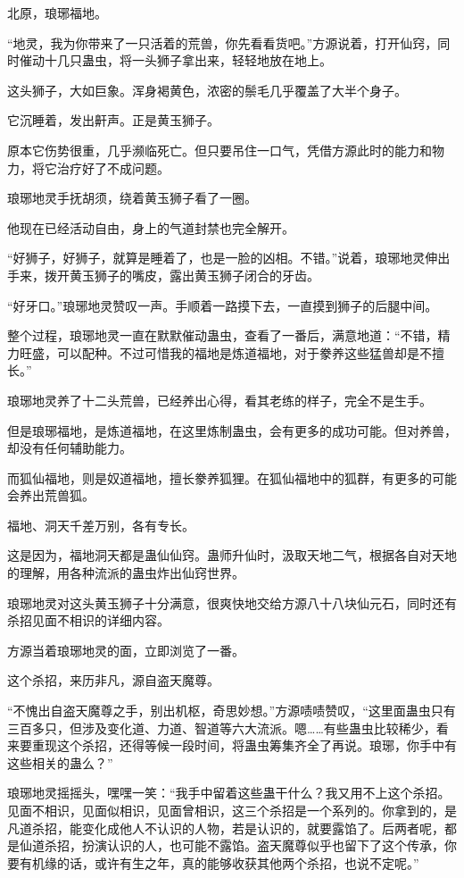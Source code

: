 
\begin{this_body}

北原，琅琊福地。

“地灵，我为你带来了一只活着的荒兽，你先看看货吧。”方源说着，打开仙窍，同时催动十几只蛊虫，将一头狮子拿出来，轻轻地放在地上。

这头狮子，大如巨象。浑身褐黄色，浓密的鬃毛几乎覆盖了大半个身子。

它沉睡着，发出鼾声。正是黄玉狮子。

原本它伤势很重，几乎濒临死亡。但只要吊住一口气，凭借方源此时的能力和物力，将它治疗好了不成问题。

琅琊地灵手抚胡须，绕着黄玉狮子看了一圈。

他现在已经活动自由，身上的气道封禁也完全解开。

“好狮子，好狮子，就算是睡着了，也是一脸的凶相。不错。”说着，琅琊地灵伸出手来，拨开黄玉狮子的嘴皮，露出黄玉狮子闭合的牙齿。

“好牙口。”琅琊地灵赞叹一声。手顺着一路摸下去，一直摸到狮子的后腿中间。

整个过程，琅琊地灵一直在默默催动蛊虫，查看了一番后，满意地道：“不错，精力旺盛，可以配种。不过可惜我的福地是炼道福地，对于豢养这些猛兽却是不擅长。”

琅琊地灵养了十二头荒兽，已经养出心得，看其老练的样子，完全不是生手。

但是琅琊福地，是炼道福地，在这里炼制蛊虫，会有更多的成功可能。但对养兽，却没有任何辅助能力。

而狐仙福地，则是奴道福地，擅长豢养狐狸。在狐仙福地中的狐群，有更多的可能会养出荒兽狐。

福地、洞天千差万别，各有专长。

这是因为，福地洞天都是蛊仙仙窍。蛊师升仙时，汲取天地二气，根据各自对天地的理解，用各种流派的蛊虫炸出仙窍世界。

琅琊地灵对这头黄玉狮子十分满意，很爽快地交给方源八十八块仙元石，同时还有杀招见面不相识的详细内容。

方源当着琅琊地灵的面，立即浏览了一番。

这个杀招，来历非凡，源自盗天魔尊。

“不愧出自盗天魔尊之手，别出机枢，奇思妙想。”方源啧啧赞叹，“这里面蛊虫只有三百多只，但涉及变化道、力道、智道等六大流派。嗯……有些蛊虫比较稀少，看来要重现这个杀招，还得等候一段时间，将蛊虫筹集齐全了再说。琅琊，你手中有这些相关的蛊么？”

琅琊地灵摇摇头，嘿嘿一笑：“我手中留着这些蛊干什么？我又用不上这个杀招。见面不相识，见面似相识，见面曾相识，这三个杀招是一个系列的。你拿到的，是凡道杀招，能变化成他人不认识的人物，若是认识的，就要露馅了。后两者呢，都是仙道杀招，扮演认识的人，也可能不露馅。盗天魔尊似乎也留下了这个传承，你要有机缘的话，或许有生之年，真的能够收获其他两个杀招，也说不定呢。”


\end{this_body}
